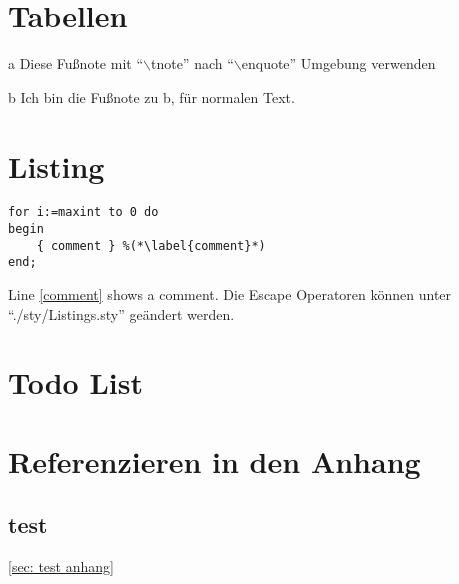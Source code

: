 \documentclass[./\jobname.tex]{subfiles}
\begin{document}
\chapter{Tabellen}
%
\begin{table}[H]
	\centering
	\noindent{}
	\label{tab: Tabelle A}
\end{table}
%
%
\begin{table}[H]
	\centering
	\begin{threeparttable}
		\label{tab: Tabelle B}
		\begin{tablenotes}
			\item [a] Diese Fußnote mit \enquote{\(\backslash\)tnote} nach \enquote{\(\backslash\)enquote} Umgebung verwenden
			\item [b] Ich bin die Fußnote zu b, für normalen Text.
		\end{tablenotes}
	\end{threeparttable}
\end{table}
%
\chapter{Listing}
%
\begin{lstlisting}[caption={example}]
for i:=maxint to 0 do
begin
	{ comment } %(*\label{comment}*)
end;
\end{lstlisting}
%
Line \ref{comment} shows a comment. Die Escape Operatoren können unter \enquote{./sty/Listings.sty} geändert werden. 
%
\chapter{Todo List}
%
\lipsum[1] 
\lipsum[2] 
\lipsum[3]
%
\chapter{Referenzieren in den Anhang}
%
\section{test}
%
\autoref{sec: test anhang}
%
\end{document}
